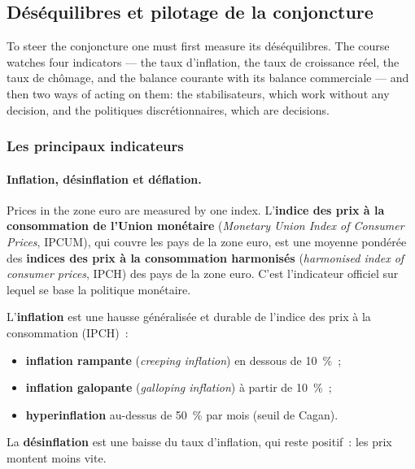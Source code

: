 \subsection{Déséquilibres et pilotage de la conjoncture}

To steer the conjoncture one must first measure its déséquilibres. The course
watches four indicators --- the taux d'inflation, the taux de croissance réel, the
taux de chômage, and the balance courante with its balance commerciale --- and
then two ways of acting on
them: the stabilisateurs, which work without any decision, and the politiques
discrétionnaires, which are decisions.

\subsubsection{Les principaux indicateurs}

\paragraph{Inflation, désinflation et déflation.} Prices in the zone euro are
measured by one index. L'\textbf{indice des prix à la consommation de l'Union
monétaire} (\textit{Monetary Union Index of Consumer Prices}, IPCUM), qui
couvre les pays de la zone euro, est une moyenne pondérée des \textbf{indices
des prix à la consommation harmonisés} (\textit{harmonised index of
consumer prices}, IPCH) des pays de la zone euro. C'est l'indicateur officiel sur
lequel se base la politique monétaire.

\begin{definition}[Inflation]
  L'\textbf{inflation} est une hausse généralisée et durable de l'indice des prix
  à la consommation (IPCH)~:
  \begin{itemize}
    \item \textbf{inflation rampante} (\textit{creeping inflation}) en dessous de
      10~\%~;
    \item \textbf{inflation galopante} (\textit{galloping inflation}) à partir de
      10~\%~;
    \item \textbf{hyperinflation} au-dessus de 50~\% par mois (seuil de Cagan).
  \end{itemize}
\end{definition}

\begin{definition}
  La \textbf{désinflation} est une baisse du taux d'inflation, qui reste
  positif~: les prix montent moins vite.
\end{definition}

